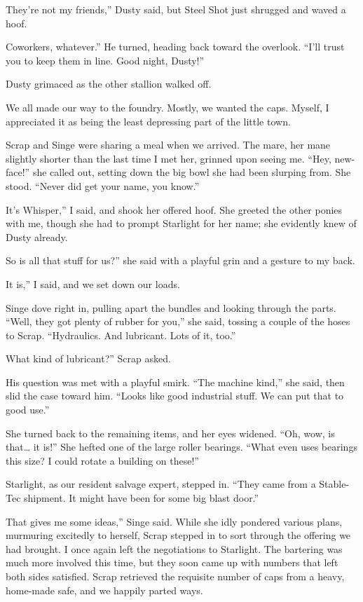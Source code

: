 \leavevmode{}They’re not my friends,” Dusty said, but Steel Shot just shrugged and waved a hoof.

\leavevmode{}Coworkers, whatever.” He turned, heading back toward the overlook. “I’ll trust you to keep them in line. Good night, Dusty!”

Dusty grimaced as the other stallion walked off.

We all made our way to the foundry. Mostly, we wanted the caps. Myself, I appreciated it as being the least depressing part of the little town.

Scrap and Singe were sharing a meal when we arrived. The mare, her mane slightly shorter than the last time I met her, grinned upon seeing me. “Hey, new-face!” she called out, setting down the big bowl she had been slurping from. She stood. “Never did get your name, you know.”

\leavevmode{}It’s Whisper,” I said, and shook her offered hoof. She greeted the other ponies with me, though she had to prompt Starlight for her name; she evidently knew of Dusty already.

\leavevmode{}So is all that stuff for us?” she said with a playful grin and a gesture to my back.

\leavevmode{}It is,” I said, and we set down our loads.

Singe dove right in, pulling apart the bundles and looking through the parts. “Well, they got plenty of rubber for you,” she said, tossing a couple of the hoses to Scrap. “Hydraulics. And lubricant. Lots of it, too.”

\leavevmode{}What kind of lubricant?” Scrap asked.

His question was met with a playful smirk. “The machine kind,” she said, then slid the case toward him. “Looks like good industrial stuff. We can put that to good use.”

She turned back to the remaining items, and her eyes widened. “Oh, wow, is that… it is!” She hefted one of the large roller bearings. “What even uses bearings this size? I could rotate a building on these!”

Starlight, as our resident salvage expert, stepped in. “They came from a Stable-Tec shipment. It might have been for some big blast door.”

\leavevmode{}That gives me some ideas,” Singe said. While she idly pondered various plans, murmuring excitedly to herself, Scrap stepped in to sort through the offering we had brought. I once again left the negotiations to Starlight. The bartering was much more involved this time, but they soon came up with numbers that left both sides satisfied. Scrap retrieved the requisite number of caps from a heavy, home-made safe, and we happily parted ways.

